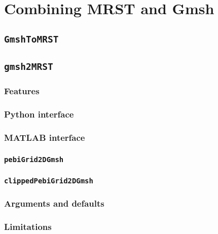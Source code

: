 \section{Combining MRST and Gmsh}
\label{sec:combining}

\subsection{\texttt{GmshToMRST}}

\subsection{\texttt{gmsh2MRST}}

\subsubsection{Features}

\subsubsection{Python interface}

\subsubsection{MATLAB interface}

\subsubsection{\texttt{pebiGrid2DGmsh}}

\subsubsection{\texttt{clippedPebiGrid2DGmsh}}

\subsubsection{Arguments and defaults}

\subsubsection{Limitations}